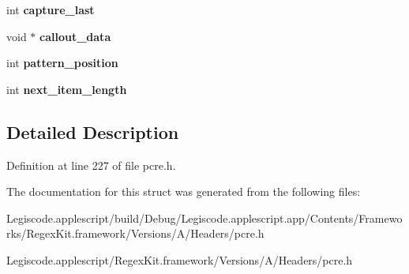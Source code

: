 \begin{DoxyCompactItemize}
\item 
\hypertarget{structpcre__callout__block_a989a280260effb9bf1521046a2507643}{int {\bfseries capture\-\_\-last}}\label{structpcre__callout__block_a989a280260effb9bf1521046a2507643}

\item 
\hypertarget{structpcre__callout__block_ae3b27d5cbb39957e227b09fc8d7d189c}{void $\ast$ {\bfseries callout\-\_\-data}}\label{structpcre__callout__block_ae3b27d5cbb39957e227b09fc8d7d189c}

\item 
\hypertarget{structpcre__callout__block_ac5caf602fa5ab812f8721451320b7adf}{int {\bfseries pattern\-\_\-position}}\label{structpcre__callout__block_ac5caf602fa5ab812f8721451320b7adf}

\item 
\hypertarget{structpcre__callout__block_a9360879d608b622daef0c7d1cf2606be}{int {\bfseries next\-\_\-item\-\_\-length}}\label{structpcre__callout__block_a9360879d608b622daef0c7d1cf2606be}

\end{DoxyCompactItemize}


\subsection{Detailed Description}


Definition at line 227 of file pcre.\-h.



The documentation for this struct was generated from the following files\-:\begin{DoxyCompactItemize}
\item 
Legiscode.\-applescript/build/\-Debug/\-Legiscode.\-applescript.\-app/\-Contents/\-Frameworks/\-Regex\-Kit.\-framework/\-Versions/\-A/\-Headers/pcre.\-h\item 
Legiscode.\-applescript/\-Regex\-Kit.\-framework/\-Versions/\-A/\-Headers/pcre.\-h\end{DoxyCompactItemize}
